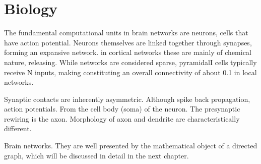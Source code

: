 \chapter{Biology}\label{ch:Biology} 


The fundamental computational units in brain networks are neurons,
cells that have action potential. Neurons themselves are linked
together through synapses, forming an expansive network. in cortical
networks these are mainly of chemical nature, releasing. While
networks are considered sparse, pyramidalI cells typically receive N
inputs, making constituting an overall connectivity of about 0.1 in
local networks.

Synaptic contacts are inherently asymmetric. Although spike back
propagation, action potentials. From the cell body (soma) of the
neuron. The presynaptic rewiring is the axon. Morphology of axon and
dendrite are characteristically different.

Brain networks. They are well presented by the mathematical object of
a directed graph, which will be discussed in detail in the next
chapter.

